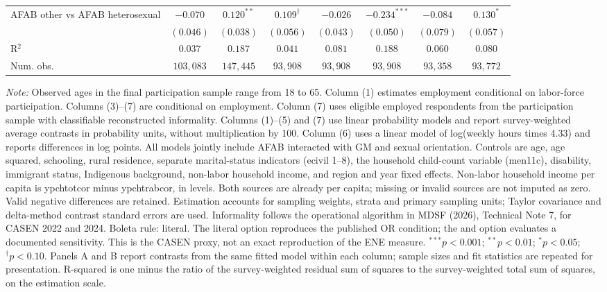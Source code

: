 \begin{table}[htpb!]
{\begin{tabular}{l c c c c c c c}
AFAB other vs AFAB heterosexual & $-0.070$ & $0.120^{**}$ & $0.109^{\dagger}$ & $-0.026$ & $-0.234^{***}$ & $-0.084$ & $0.130^{*}$ \\
 & $(0.046)$ & $(0.038)$ & $(0.056)$ & $(0.043)$ & $(0.050)$ & $(0.079)$ & $(0.057)$ \\
\hline
R$^2$ & $0.037$ & $0.187$ & $0.041$ & $0.081$ & $0.188$ & $0.060$ & $0.080$ \\
Num. obs. & $103,083$ & $147,445$ & $93,908$ & $93,908$ & $93,908$ & $93,358$ & $93,772$ \\
\hline
\end{tabular}%
}
\par\vspace{1ex}
\begin{minipage}{\textwidth}\footnotesize\raggedright
\textit{Note:} Observed ages in the final participation sample range from 18 to 65. Column (1) estimates employment conditional on labor-force participation. Columns (3)--(7) are conditional on employment.  Column (7) uses eligible employed respondents from the participation sample with classifiable reconstructed informality. Columns (1)--(5) and (7) use linear probability models and report survey-weighted average contrasts in probability units, without multiplication by 100. Column (6) uses a linear model of log(weekly hours times 4.33) and reports differences in log points. All models jointly include AFAB interacted with GM and sexual orientation. Controls are age, age squared, schooling, rural residence, separate marital-status indicators (ecivil 1--8), the household child-count variable (men11c), disability, immigrant status, Indigenous background, non-labor household income, and region and year fixed effects. Non-labor household income per capita is ypchtotcor minus ypchtrabcor, in levels. Both sources are already per capita; missing or invalid sources are not imputed as zero. Valid negative differences are retained. Estimation accounts for sampling weights, strata and primary sampling units; Taylor covariance and delta-method contrast standard errors are used. Informality follows the operational algorithm in MDSF (2026), Technical Note 7, for CASEN 2022 and 2024. Boleta rule: literal. The literal option reproduces the published OR condition; the and option evaluates a documented sensitivity. This is the CASEN proxy, not an exact reproduction of the ENE measure. $^{***}p<0.001$; $^{**}p<0.01$; $^{*}p<0.05$; $^{\dagger}p<0.10$. Panels A and B report contrasts from the same fitted model within each column; sample sizes and fit statistics are repeated for presentation. R-squared is one minus the ratio of the survey-weighted residual sum of squares to the survey-weighted total sum of squares, on the estimation scale.
\end{minipage}
\end{table}
